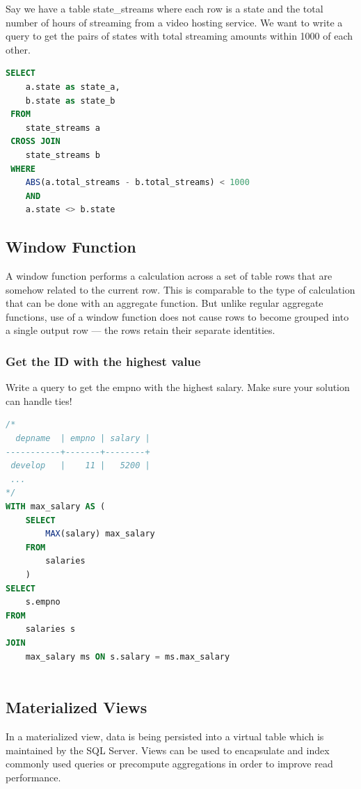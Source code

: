 \documentclass{article}
\begin{document}
Say we have a table state\_streams where each row is a state and the total number of hours of streaming from a video hosting service. We want to write a query to get the pairs of states with total streaming amounts within 1000 of each other. 

\vspace{8pt} \begin{lstlisting}[language=SQL]
SELECT
    a.state as state_a, 
    b.state as state_b 
 FROM   
    state_streams a
 CROSS JOIN 
    state_streams b 
 WHERE 
    ABS(a.total_streams - b.total_streams) < 1000
    AND 
    a.state <> b.state 
\end{lstlisting}


\subsection{Window Function}
A window function performs a calculation across a set of table rows that are somehow related to the current row. This is comparable to the type of calculation that can be done with an aggregate function. But unlike regular aggregate functions, use of a window function does not cause rows to become grouped into a single output row — the rows retain their separate identities.

\subsubsection{Get the ID with the highest value}

Write a query to get the empno with the highest salary. Make sure your solution can handle ties!

\vspace{8pt} \begin{lstlisting}[language=SQL]
/*
  depname  | empno | salary |     
-----------+-------+--------+
 develop   |    11 |   5200 | 
 ...
*/
WITH max_salary AS (
    SELECT 
        MAX(salary) max_salary
    FROM 
        salaries
    )
SELECT 
    s.empno
FROM 
    salaries s
JOIN 
    max_salary ms ON s.salary = ms.max_salary 
    
\end{lstlisting}

\subsection{Materialized Views}
In a materialized view, data is being persisted into a virtual table which is maintained by the SQL Server. Views can be used to encapsulate and index commonly used queries or precompute aggregations in order to improve read performance. 
\end{document}
